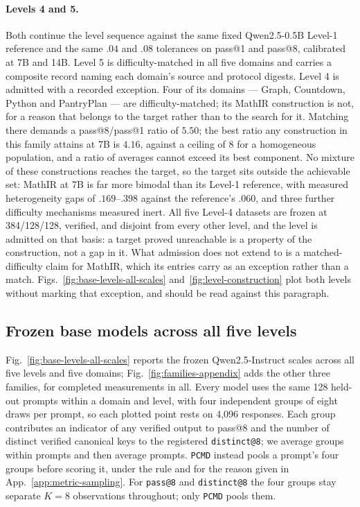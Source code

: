 \documentclass{article}
\makeatletter
\newcommand{\1}{\mathbf 1}
\newcommand{\pmd}{\texttt{PCMD}}
\newcommand{\distk}{\texttt{distinct@8}}
\theoremstyle{remark}
\theoremstyle{definition}
\theoremstyle{plain}
\makeatother
\begin{document}
\paragraph{Levels 4 and 5.}
Both continue the level sequence against the same fixed Qwen2.5-0.5B Level-1 reference
and the same $.04$ and $.08$ tolerances on pass@1 and pass@8, calibrated at 7B
and 14B. Level 5 is difficulty-matched in all five domains and carries a
composite record naming each domain's source and protocol digests. Level 4 is
admitted with a recorded exception. Four of its domains --- Graph, Countdown,
Python and PantryPlan --- are difficulty-matched; its MathIR construction is
not, for a reason that belongs to the target rather than to the search for it. Matching there demands a pass@8/pass@1 ratio of $5.50$; the best
ratio any construction in this family attains at 7B is $4.16$, against a ceiling
of $8$ for a homogeneous population, and a ratio of averages cannot exceed its
best component. No mixture of these constructions reaches the target, so the
target sits outside the achievable set: MathIR at 7B is far more bimodal than
its Level-1 reference, with measured heterogeneity gaps of $.169$--$.398$
against the reference's $.060$, and three further difficulty mechanisms measured
inert. All five Level-4 datasets are frozen at 384/128/128, verified, and
disjoint from every other level, and the level is admitted on that basis: a
target proved unreachable is a property of the construction, not a gap in it.
What admission does not extend to is a matched-difficulty claim for MathIR,
which its entries carry as an exception rather than a match.
Figs.~\ref{fig:base-levels-all-scales} and~\ref{fig:level-construction} plot
both levels without marking that exception, and should be read against this
paragraph.

\subsection{Frozen base models across all five levels}
\label{app:base-levels-all-scales}

Fig.~\ref{fig:base-levels-all-scales} reports the frozen Qwen2.5-Instruct
scales across all five levels and five domains;
Fig.~\ref{fig:families-appendix} adds the other three families, for
\MDcells{} completed measurements in all. Every model uses the same 128 held-out
prompts within a domain and level, with four independent groups of eight draws
per prompt, so each plotted point rests on 4,096 responses. Each group contributes an indicator
of any verified output to pass@8 and the number of distinct verified canonical
keys to the registered \distk{}; we average groups within prompts and then
average prompts. \pmd{} instead pools a prompt's four groups before scoring it,
under the rule and for the reason given in App.~\ref{app:metric-sampling}.
For \texttt{pass@8} and \distk{} the four groups stay separate $K=8$
observations throughout; only \pmd{} pools them.
\end{document}
